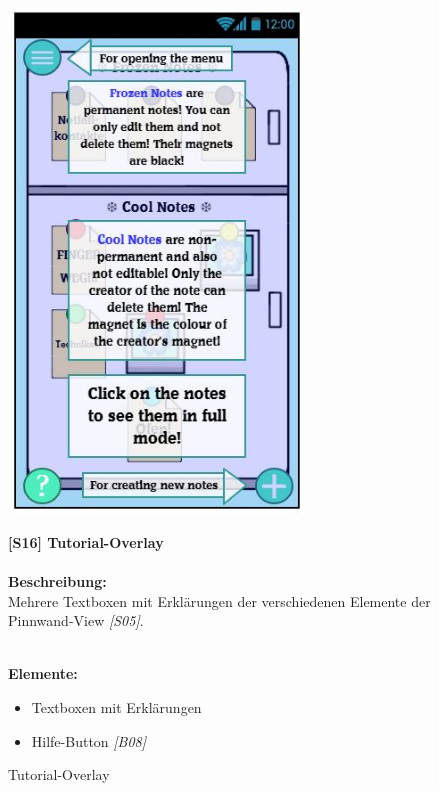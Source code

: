 \documentclass[a4paper]{scrreprt}
\begin{document}
    	\clearpage
    	
    	\begin{figure}[h!]
    		\begin{minipage}[t]{0.4\linewidth}
    			\flushright
    			\centering
    			\vspace{9mm}
    			\includegraphics[width=0.7\textwidth]{fridget_tutorial.JPG}
    			\caption{Tutorial-Overlay}
    			\label{fig:figure1}
    		\end{minipage}
    		\hspace{0.5cm}
    		\begin{minipage}[t]{0.55\linewidth}
    			\flushleft
    			\vspace{9mm}
    			\textbf{{[}S16{]} Tutorial-Overlay}\\
    			\hfill
    			\\
    			\textbf{Beschreibung:} \\
    			Mehrere Textboxen mit Erklärungen der  
    			verschiedenen Elemente der
    			Pinnwand-View \textit{{[}S05{]}}.
    			
    			\hfill 
    			\\\textbf{Elemente:}\\
    			\begin{itemize}
    				\renewcommand\labelitemi{--}
    				\item Textboxen mit Erklärungen
    				\item Hilfe-Button \textit{{[}B08{]}}
    				

\end{itemize}
\end{minipage}
\end{figure}
\end{document}
